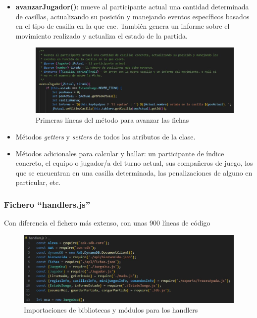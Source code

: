 \begin{itemize}
	\item \textbf{avanzarJugador()}: mueve al participante actual una cantidad determinada de casillas, actualizando su posición y manejando eventos específicos basados en el tipo de casilla en la que cae. También genera un informe sobre el movimiento realizado y actualiza el estado de la partida.
	\begin{figure}[H]
		\centering
		\includegraphics{imgs/codigo-oca-4.jpg}
		\caption{Primeras líneas del método para avanzar las fichas}
		\label{fig:codigo-oca-4}
	\end{figure}
	
	\item Métodos \textit{getters} y \textit{setters} de todos los atributos de la clase.
	\item Métodos adicionales para calcular y hallar: un participante de índice concreto, el equipo o jugador/a del turno actual, sus compañeros de juego, los que se encuentran en una casilla determinada, las penalizaciones de alguno en particular, etc.
\end{itemize}

\subsubsection{Fichero \enquote{handlers.js}}

Con diferencia el fichero más extenso, con unas 900 líneas de código

\begin{figure}[H]
	\centering
	\includegraphics[width=1\textwidth]{imgs/codigo-handlers-1.jpg}
	\caption{Importaciones de bibliotecas y módulos para los handlers}
	\label{fig:codigo-handlers-1}
\end{figure}

